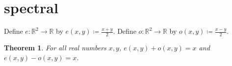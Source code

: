 \documentclass{article}
\newtheorem{theorem}{Theorem}
\begin{document}
\section{spectral}
Define $e:\mathbb{R}^2\to\mathbb{R}$ by $e(x,y)\coloneqq\frac{x+y}{2}$.
Define $o:\mathbb{R}^2\to\mathbb{R}$ by $o(x,y)\coloneqq\frac{x-y}{2}$.
\begin{theorem}\label{thm:RS02}
For all real numbers $x,y$, $e(x,y)+o(x,y)=x$ and $e(x,y)-o(x,y)=x$.
\end{theorem}
\end{document}
